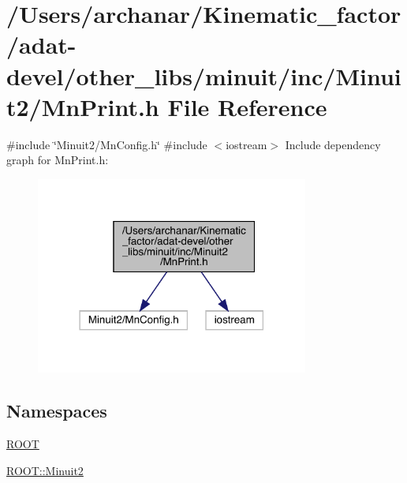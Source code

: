 \hypertarget{adat-devel_2other__libs_2minuit_2inc_2Minuit2_2MnPrint_8h}{}\section{/\+Users/archanar/\+Kinematic\+\_\+factor/adat-\/devel/other\+\_\+libs/minuit/inc/\+Minuit2/\+Mn\+Print.h File Reference}
\label{adat-devel_2other__libs_2minuit_2inc_2Minuit2_2MnPrint_8h}
{\ttfamily \#include \char`\"{}Minuit2/\+Mn\+Config.\+h\char`\"{}}\newline
{\ttfamily \#include $<$iostream$>$}\newline
Include dependency graph for Mn\+Print.\+h\+:
\nopagebreak
\begin{figure}[H]
\begin{center}
\leavevmode
\includegraphics[width=254pt]{db/d0d/adat-devel_2other__libs_2minuit_2inc_2Minuit2_2MnPrint_8h__incl}
\end{center}
\end{figure}
\subsection*{Namespaces}
\begin{DoxyCompactItemize}
\item 
 \mbox{\hyperlink{namespaceROOT}{R\+O\+OT}}
\item 
 \mbox{\hyperlink{namespaceROOT_1_1Minuit2}{R\+O\+O\+T\+::\+Minuit2}}
\end{DoxyCompactItemize}
